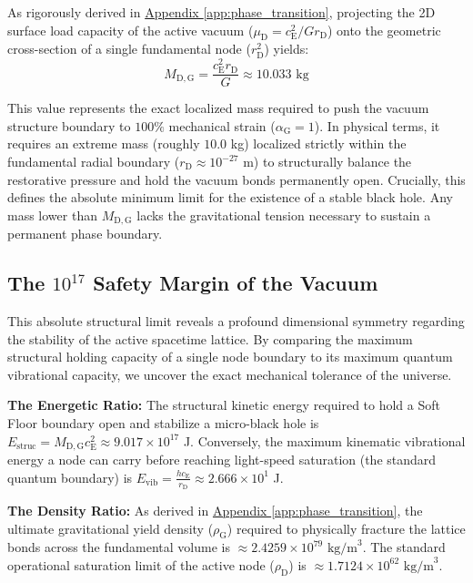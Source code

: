 As rigorously derived in \hyperref[app:phase_transition]{Appendix \ref*{app:phase_transition}}, projecting the 2D surface load capacity of the active vacuum ($\mu_{\mathrm{D}} = c_{\mathrm{E}}^2 / G r_{\mathrm{D}}$) onto the geometric cross-section of a single fundamental node ($r_{\mathrm{D}}^2$) yields:
\begin{equation}
    M_{\mathrm{D,G}} = \frac{c_{\mathrm{E}}^2 r_{\mathrm{D}}}{G} \approx 10.033 \text{ kg}
\end{equation}

This value represents the exact localized mass required to push the vacuum structure boundary to $100\%$ mechanical strain ($\alpha_{\mathrm{G}} = 1$). In physical terms, it requires an extreme mass (roughly $10.0$ kg) localized strictly within the fundamental radial boundary ($r_{\mathrm{D}} \approx 10^{-27}$ m) to structurally balance the restorative pressure and hold the vacuum bonds permanently open. Crucially, this defines the absolute minimum limit for the existence of a stable black hole. Any mass lower than $M_{\mathrm{D,G}}$ lacks the gravitational tension necessary to sustain a permanent phase boundary.

\subsection{The $10^{17}$ Safety Margin of the Vacuum}
This absolute structural limit reveals a profound dimensional symmetry regarding the stability of the active spacetime lattice. By comparing the maximum structural holding capacity of a single node boundary to its maximum quantum vibrational capacity, we uncover the exact mechanical tolerance of the universe.

\vspace{0.5em}
\noindent\textbf{The Energetic Ratio:} The structural kinetic energy required to hold a Soft Floor boundary open and stabilize a micro-black hole is $E_{\mathrm{struc}} = M_{\mathrm{D,G}} c_{\mathrm{E}}^2 \approx 9.017 \times 10^{17}$ J. Conversely, the maximum kinematic vibrational energy a node can carry before reaching light-speed saturation (the standard quantum boundary) is $E_{\mathrm{vib}} = \frac{h c_{\mathrm{E}}}{r_{\mathrm{D}}} \approx 2.666 \times 10^1$ J.

\vspace{0.5em}
\noindent\textbf{The Density Ratio:} As derived in \hyperref[app:phase_transition]{Appendix \ref*{app:phase_transition}}, the ultimate gravitational yield density ($\rho_{\mathrm{G}}$) required to physically fracture the lattice bonds across the fundamental volume is $\approx 2.4259 \times 10^{79} \text{ kg/m}^3$. The standard operational saturation limit of the active node ($\rho_{\mathrm{D}}$) is $\approx 1.7124 \times 10^{62} \text{ kg/m}^3$.


